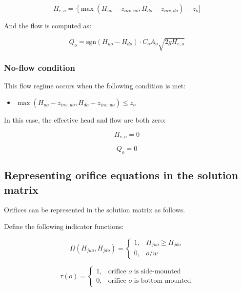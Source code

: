 \documentclass[11pt]{article}
\begin{document}
\begin{equation}
  H_{e,o} = \cdot \bigl[ \max(H_{uo} - z_{inv,uo}, H_{do} - z_{inv,do}) - z_o \bigr]
\end{equation}

And the flow is computed as:

\begin{equation}
 Q_o = \text{sgn}(H_{uo} - H_{do}) \cdot C_o A_o \sqrt{2 g H_{e,o}} 
\end{equation}

\subsubsection*{No-flow condition}

This flow regime occurs when the following condition is met:

\begin{itemize}
\item $\max(H_{uo} - z_{inv,uo}, H_{do} - z_{inv,uo}) \leq z_o$
\end{itemize}

In this case, the effective head and flow are both zero:

\begin{equation}
  H_{e,o} = 0
\end{equation}

\begin{equation}
  Q_{o} = 0
\end{equation}

\subsection{Representing orifice equations in the solution matrix}

Orifices can be represented in the solution matrix as follows.

Define the following indicator functions:

\begin{equation}
  \Omega(H_{juo}, H_{jdo}) = 
  \begin{cases}
    1, & H_{juo} \geq H_{jdo} \\
    0, & o/w
  \end{cases}
\end{equation}

\begin{equation}
  \tau(o) = 
  \begin{cases}
    1, & \text{orifice $o$ is side-mounted} \\
    0, & \text{orifice $o$ is bottom-mounted}
  \end{cases}
\end{equation}
\end{document}
